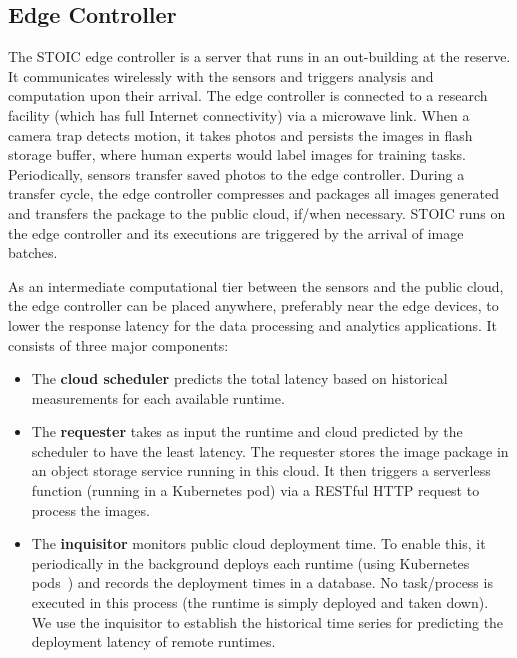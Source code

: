 \subsection{Edge Controller} 

The STOIC edge controller is a server that runs in an
out-building at the reserve. It communicates wirelessly with the sensors and triggers analysis and computation upon their arrival. The edge controller is connected to a research facility (which has full Internet connectivity) 
via a microwave link. When a camera trap detects motion, it takes photos and persists the images in flash storage buffer, where human experts would label images for training tasks. Periodically, sensors transfer saved photos to the edge controller. During a transfer cycle, the edge controller compresses and packages all images generated and transfers the package to the public cloud, if/when necessary. STOIC runs on the edge controller and its executions are triggered by the arrival of image batches. 

As an intermediate computational tier between the sensors and the public cloud, the edge controller can be placed anywhere, preferably near the edge devices, to lower the response latency for the data processing and analytics applications. It consists of three major components: 
\begin{itemize}
\item The \textbf{cloud scheduler} predicts the total latency based on historical measurements for each available runtime. 
\item The \textbf{requester} takes as input the runtime and cloud predicted by the scheduler to have the least latency.  The requester stores the image package in an object storage service running in this cloud. It then triggers a serverless function (running in a Kubernetes pod) via a RESTful HTTP request to process the images.
\item The \textbf{inquisitor} monitors public cloud deployment time. To enable this, it periodically in the background deploys each runtime (using Kubernetes pods~\cite{ref:pods}) and records the deployment times in a database. No task/process is executed in this process (the runtime is simply deployed and taken down). We use the inquisitor to establish the historical time series for predicting the deployment latency of remote runtimes.
\end{itemize}

